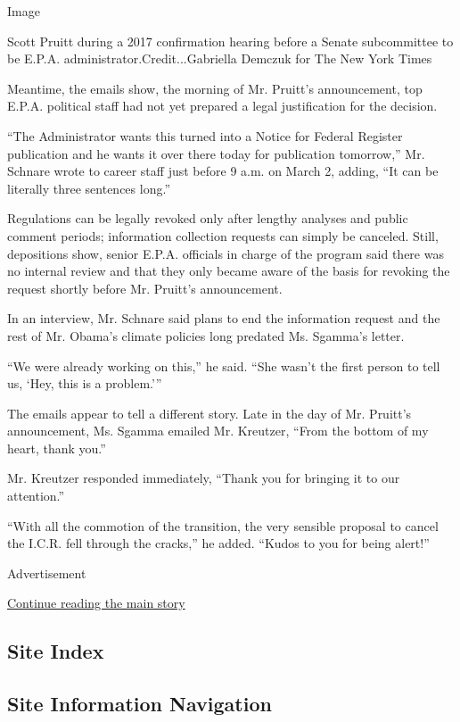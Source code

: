 Image

Scott Pruitt during a 2017 confirmation hearing before a Senate
subcommittee to be E.P.A. administrator.Credit...Gabriella Demczuk for
The New York Times

Meantime, the emails show, the morning of Mr. Pruitt's announcement, top
E.P.A. political staff had not yet prepared a legal justification for
the decision.

``The Administrator wants this turned into a Notice for Federal Register
publication and he wants it over there today for publication tomorrow,''
Mr. Schnare wrote to career staff just before 9 a.m. on March 2, adding,
``It can be literally three sentences long.''

Regulations can be legally revoked only after lengthy analyses and
public comment periods; information collection requests can simply be
canceled. Still, depositions show, senior E.P.A. officials in charge of
the program said there was no internal review and that they only became
aware of the basis for revoking the request shortly before Mr. Pruitt's
announcement.

In an interview, Mr. Schnare said plans to end the information request
and the rest of Mr. Obama's climate policies long predated Ms. Sgamma's
letter.

``We were already working on this,'' he said. ``She wasn't the first
person to tell us, `Hey, this is a problem.'''

The emails appear to tell a different story. Late in the day of Mr.
Pruitt's announcement, Ms. Sgamma emailed Mr. Kreutzer, ``From the
bottom of my heart, thank you.''

Mr. Kreutzer responded immediately, ``Thank you for bringing it to our
attention.''

``With all the commotion of the transition, the very sensible proposal
to cancel the I.C.R. fell through the cracks,'' he added. ``Kudos to you
for being alert!''

Advertisement

\protect\hyperlink{after-bottom}{Continue reading the main story}

\hypertarget{site-index}{%
\subsection{Site Index}\label{site-index}}

\hypertarget{site-information-navigation}{%
\subsection{Site Information
Navigation}\label{site-information-navigation}}

